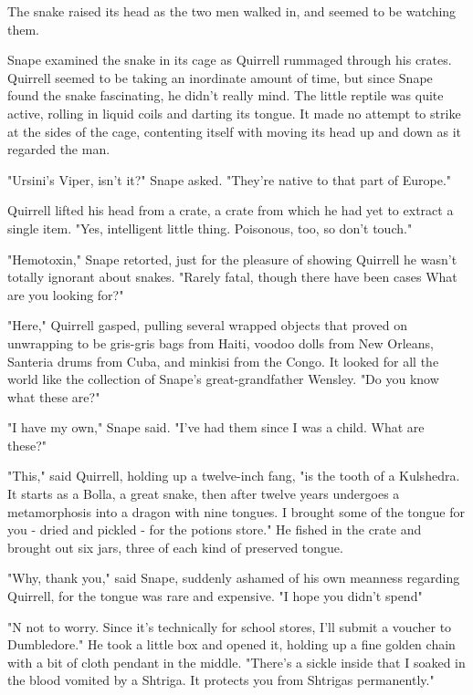 The snake raised its head as the two men walked in, and seemed to be watching them.

Snape examined the snake in its cage as Quirrell rummaged through his crates. Quirrell seemed to be taking an inordinate amount of time, but since Snape found the snake fascinating, he didn't really mind. The little reptile was quite active, rolling in liquid coils and darting its tongue. It made no attempt to strike at the sides of the cage, contenting itself with moving its head up and down as it regarded the man.

"Ursini's Viper, isn't it?" Snape asked. "They're native to that part of Europe."

Quirrell lifted his head from a crate, a crate from which he had yet to extract a single item. "Yes, intelligent little thing. Poisonous, too, so don't touch."

"Hemotoxin," Snape retorted, just for the pleasure of showing Quirrell he wasn't totally ignorant about snakes. "Rarely fatal, though there have been cases{\el} What are you looking for?"

"Here," Quirrell gasped, pulling several wrapped objects that proved on unwrapping to be gris-gris bags from Haiti, voodoo dolls from New Orleans, Santeria drums from Cuba, and minkisi from the Congo. It looked for all the world like the collection of Snape's great-grandfather Wensley. "Do you know what these are?"

"I have my own," Snape said. "I've had them since I was a child. What are these?"

"This," said Quirrell, holding up a twelve-inch fang, "is the tooth of a Kulshedra. It starts as a Bolla, a great snake, then after twelve years undergoes a metamorphosis into a dragon with nine tongues. I brought some of the tongue for you - dried and pickled - for the potions store." He fished in the crate and brought out six jars, three of each kind of preserved tongue.

"Why, thank you," said Snape, suddenly ashamed of his own meanness regarding Quirrell, for the tongue was rare and expensive. "I hope you didn't spend{\el}"

"N{\el} not to worry. Since it's technically for school stores, I'll submit a voucher to Dumbledore." He took a little box and opened it, holding up a fine golden chain with a bit of cloth pendant in the middle. "There's a sickle inside that I soaked in the blood vomited by a Shtriga. It protects you from Shtrigas permanently."

